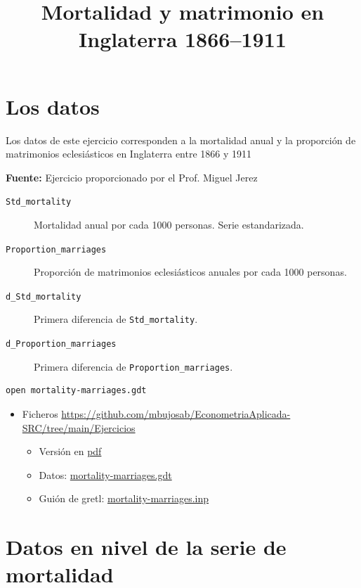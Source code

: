 \documentclass[10pt]{article}
\date{}
\title{Mortalidad y matrimonio en Inglaterra 1866--1911}
\begin{document}
\maketitle
\section*{Los datos}
\label{sec:org330bb23}

Los datos de este ejercicio corresponden a la mortalidad anual y la
proporción de matrimonios eclesiásticos en Inglaterra entre 1866 y
1911 

\textbf{Fuente:} Ejercicio proporcionado por el Prof. Miguel Jerez

\begin{description}
\item[{\texttt{Std\_mortality}}] Mortalidad anual por cada 1000 personas. Serie estandarizada.
\item[{\texttt{Proportion\_marriages}}] Proporción de matrimonios eclesiásticos
anuales por cada 1000 personas.
\item[{\texttt{d\_Std\_mortality}}] Primera diferencia de \texttt{Std\_mortality}.
\item[{\texttt{d\_Proportion\_marriages}}] Primera diferencia de
\texttt{Proportion\_marriages}.
\end{description}

\begin{verbatim}
open mortality-marriages.gdt
\end{verbatim}

\begin{itemize}
\item Ficheros \url{https://github.com/mbujosab/EconometriaAplicada-SRC/tree/main/Ejercicios}
\begin{itemize}
\item Versión en \href{https://github.com/mbujosab/EconometriaAplicada-SRC/blob/main/Ejercicios/mortality-marriages.pdf}{pdf}
\item Datos: \href{mortality-marriages.gdt}{mortality-marriages.gdt}
\item Guión de gretl: \href{mortality-marriages.inp}{mortality-marriages.inp}
\end{itemize}
\end{itemize}
\section*{Datos en nivel de la serie de mortalidad}
\label{sec:org96737d7}
\end{document}
